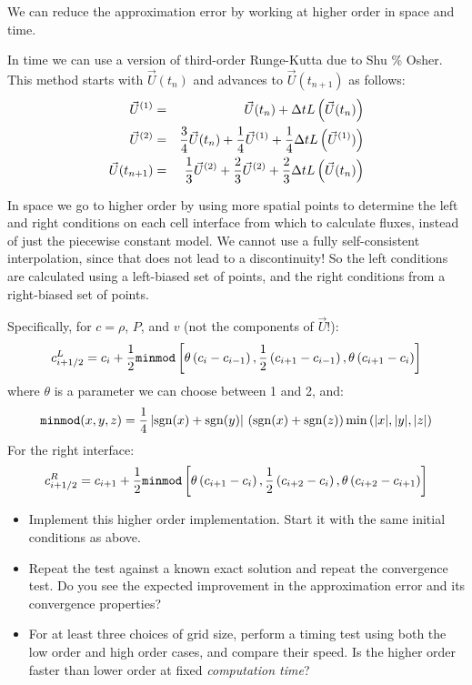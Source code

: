 \documentclass[11pt, preprint]{aastex}
\begin{document}
We can reduce the approximation error by working at higher order
in space and time.

In time we can use a version of third-order Runge-Kutta due to Shu \%
Osher. This method starts with $\vec{U}(t_n)$ and advances to
$\vec{U}(t_{n+1})$ as follows:
\begin{eqnarray}
\vec{U}^{(1)} &=& \vec{U}(t_n) + \Delta t L\left(\vec{U}(t_n)\right)
\cr
\vec{U}^{(2)} &=& \frac{3}{4} \vec{U}(t_n) + \frac{1}{4} \vec{U}^{(1)}
+ \frac{1}{4} \Delta t L\left(\vec{U}^{(1)})\right)\cr
\vec{U}(t_{n+1}) &=& \frac{1}{3} \vec{U}^{(2)} + \frac{2}{3} \vec{U}^{(2)}
+ \frac{2}{3} \Delta t L\left(\vec{U}(t_n)\right)
\end{eqnarray}

In space we go to higher order by using more spatial points to
determine the left and right conditions on each cell interface from
which to calculate fluxes, instead of just the piecewise constant
model. We cannot use a fully self-consistent interpolation, since that
does not lead to a discontinuity! So the left conditions are
calculated using a left-biased set of points, and the right conditions
from a right-biased set of points.

Specifically, for $c= \rho$, $P$, and $v$ (not the components of
$\vec{U}$!):
\begin{equation}
  c_{i+1/2}^L = c_i + \frac{1}{2}
  {\tt minmod}\left[\theta \left(c_i - c_{i-1}\right),
  \frac{1}{2}\left(c_{i+1} - c_{i-1}\right), 
  \theta \left(c_{i+1} - c_{i}\right) \right] 
\end{equation}
where $\theta$ is a parameter we can choose between 1 and 2, and:
\begin{equation}
  {\tt minmod}(x, y, z) = \frac{1}{4}\left| {\rm sgn}(x) + {\rm
    sgn}(y) \right| \,
  \left( {\rm sgn}(x) + {\rm sgn}(z)\right) {\rm min}\left(|x|, |y|,
  |z|\right)
\end{equation}
For the right interface:
\begin{equation}
  c_{i+1/2}^R = c_{i+1} + \frac{1}{2}
  {\tt minmod}\left[\theta \left(c_{i+1} - c_{i}\right),
  \frac{1}{2}\left(c_{i+2} - c_{i}\right), 
  \theta \left(c_{i+2} - c_{i+1}\right) \right] 
\end{equation}

\begin{itemize}
\item Implement this higher order implementation. Start it with the
  same initial conditions as above.
\item Repeat the test against a known exact solution and repeat the
  convergence test. Do you see the expected improvement in the
  approximation error and its convergence properties?
\item For at least three choices of grid size, perform a timing test
  using both the low order and high order cases, and compare their
  speed. Is the higher order faster than lower order at fixed {\it
    computation time}?
\end{itemize}
\end{document}
